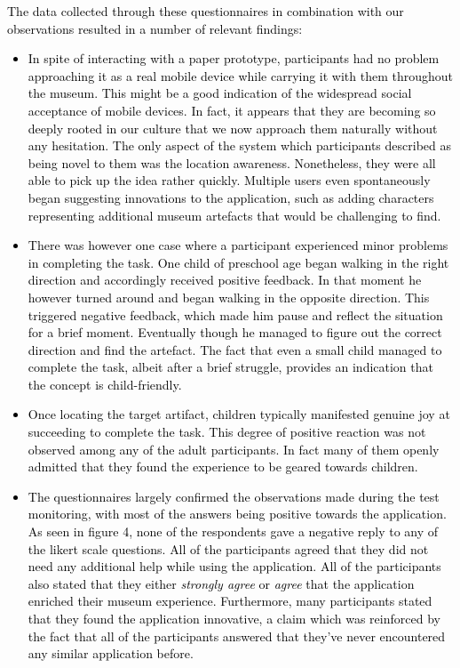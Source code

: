 \documentclass[prodmode,acmtomm]{acmsmall}
\begin{document}
\textcolor{black}{
The data collected through these questionnaires in combination with our observations  resulted in a number of relevant findings: \begin{itemize}
	\item In spite of interacting with a paper prototype, participants had no problem approaching it as a real mobile device while carrying it with them throughout the museum. This might be a good indication of the widespread social acceptance of mobile devices. In fact, it appears that they are becoming so deeply rooted in our culture that we now approach them naturally without any hesitation. The only aspect of the system which participants described as being novel to them was the location awareness. Nonetheless, they were all able to pick up the idea rather quickly. Multiple users even spontaneously began suggesting innovations to the application, such as adding characters representing additional museum artefacts that would be challenging to find. 
\item There was however one case where a participant experienced minor problems in completing the task. One child of preschool age began walking in the right direction and accordingly received positive feedback. In that moment he however turned around and began walking in the opposite direction. This triggered negative feedback, which made him pause and reflect the situation for a brief moment. Eventually though he managed to figure out the correct direction and find the artefact. The fact that even a small child managed to complete the task, albeit after a brief struggle, provides an indication that the concept is child-friendly. 
\item Once locating the target artifact, children typically manifested genuine joy at succeeding to complete the task. This degree of positive reaction was not observed among any of the adult participants. In fact many of them openly admitted that they found the experience to be geared towards children. 
\item The questionnaires largely confirmed the observations made during the test monitoring, with most of the answers being positive towards the application. \textcolor{black}{As seen in figure 4, none of the respondents gave a negative reply to any of the likert scale questions.} \textcolor{black}{All of the participants agreed that they did not need any additional help while using the application.} All of the participants also stated that they either \textit{strongly agree} or \textit{agree} that the application enriched their museum experience. Furthermore, many participants stated that they found the application innovative, a claim which was reinforced by the fact that all of the participants answered that they've never encountered any similar application before. 
\end{itemize}
} 
\end{document}
